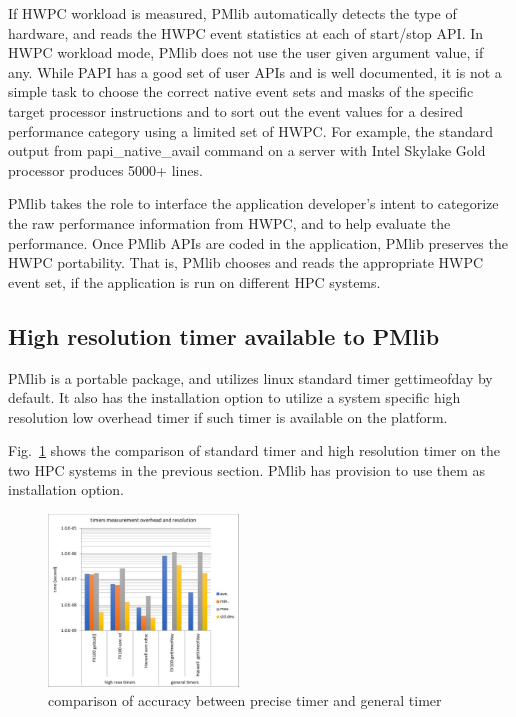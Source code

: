 \documentclass[conference]{IEEEtran}
\begin{document}
If HWPC workload is measured,
PMlib automatically detects the type of hardware, and reads the HWPC
event statistics at each of start/stop API.
In HWPC workload mode, PMlib does not use the user given argument value,
if any.
While PAPI has a good set of user APIs and is well documented,
it is not a simple task to choose the correct native event sets and masks
of the specific target processor instructions and to sort out the event
values for a desired performance category using a limited set of HWPC.
For example,
the standard output from papi\_native\_avail command on a server with
Intel Skylake Gold processor produces 5000+ lines.

PMlib takes the role to interface the application developer's intent to
categorize the raw performance information from HWPC, and to
help evaluate the performance.
Once PMlib APIs are coded in the application, PMlib preserves the HWPC
portability. That is, PMlib chooses and reads the appropriate HWPC event
set, if the application is run on different HPC systems.

\subsection{High resolution timer available to PMlib}
PMlib is a portable package, and utilizes linux standard timer
gettimeofday by default. It also has the installation option to utilize
a system specific high resolution low overhead timer if such timer is
available on the platform.

Fig.~\ref{fig:precise-timer} shows the comparison of standard timer and
high resolution timer on the two HPC systems in the previous section.
PMlib has provision to use them as installation option.

\begin{figure}[tb]
\centering
\includegraphics[width=0.45\textwidth]{figs/precise-timer.pdf}
\caption{comparison of accuracy between precise timer and general timer}
\label{fig:precise-timer}
\end{figure}
\end{document}
